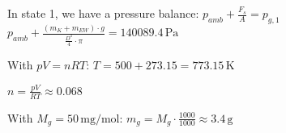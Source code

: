 In state 1, we have a pressure balance:  
\( p_{amb} + \frac{F_s}{A} = p_{g,1} \)  
\( p_{amb} + \frac{(m_K + m_{EW}) \cdot g}{\frac{D^2}{4} \cdot \pi} = 140089.4 \, \text{Pa} \)  

With \( pV = nRT \):  
\( T = 500 + 273.15 = 773.15 \, \text{K} \)  

\( n = \frac{pV}{RT} \approx 0.068 \)  

With \( M_g = 50 \, \text{mg/mol} \):  
\( m_g = M_g \cdot \frac{1000}{1000} \approx 3.4 \, \text{g} \)